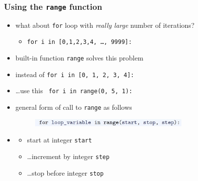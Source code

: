 \documentclass[english,14pt]{beamer}
\newcommand\red[1]{{\color{red} #1}}
\newcommand{\xmark}{\ding{55}}%
\begin{document}
\begin{frame}[fragile]

\frametitle{Using the \texttt{range} function}

\begin{itemize}
	\item what about \texttt{for} loop with \emph{really large} number of iterations?
	\begin{itemize}
		\item[\red{\xmark}] \texttt{for i in [0,1,2,3,4, \ldots, 9999]:}
	\end{itemize}
	
	\item built-in function \texttt{range} solves this problem
	
	\item instead of \verb+for i in [0, 1, 2, 3, 4]:+

	\item[] \ldots use this~ \verb+for i in range(0, 5, 1):+
	
	\item general form of call to \texttt{range} as follows
	\begin{figure}[ht]
		\centering
		\includegraphics[width=0.75\textwidth]{figures/LLp64c}
	\end{figure}
	\item[]%
	\begin{itemize}
		\item start at integer \texttt{start}
		\item[] \qquad\ldots increment by integer \texttt{step}
		\item[] \qquad\qquad\ldots stop before integer \texttt{stop}
	\end{itemize}

\end{itemize}

\end{frame}

\end{document}

